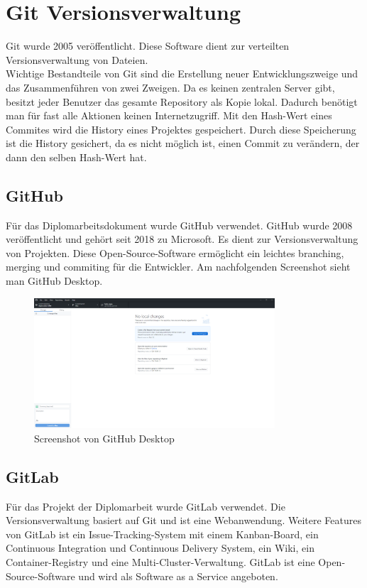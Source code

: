 \section{Git Versionsverwaltung}
Git wurde 2005 veröffentlicht. Diese Software dient zur verteilten Versionsverwaltung von Dateien.\\
Wichtige Bestandteile von Git sind die Erstellung neuer Entwicklungszweige und das Zusammenführen von zwei Zweigen. Da es keinen zentralen Server gibt, besitzt jeder Benutzer das gesamte Repository als Kopie lokal. Dadurch benötigt man für fast alle Aktionen keinen Internetzugriff. Mit den Hash-Wert eines Commites wird die History eines Projektes gespeichert. Durch diese Speicherung ist die History gesichert, da es nicht möglich ist, einen Commit zu verändern, der dann den selben Hash-Wert hat. \autocite{wikiGit}
\subsection{GitHub}
Für das Diplomarbeitsdokument wurde GitHub verwendet. GitHub wurde 2008 veröffentlicht und gehört seit 2018 zu Microsoft. Es dient zur Versionsverwaltung von Projekten. Diese Open-Source-Software ermöglicht ein leichtes branching, merging und commiting für die Entwickler. \autocite{wikiGitHub}
Am nachfolgenden Screenshot sieht man GitHub Desktop.
\begin{figure}[h]
	\centerline{
		\includegraphics[width=0.8\textwidth]{./grafiken/github_screen.png}
	}
	\vskip0pt
	\caption{Screenshot von GitHub Desktop} \label{fig:postman}
\end{figure}
\subsection{GitLab}
Für das Projekt der Diplomarbeit wurde GitLab verwendet. Die Versionsverwaltung basiert auf Git und ist eine Webanwendung. Weitere Features von GitLab ist ein Issue-Tracking-System mit einem Kanban-Board, ein Continuous Integration und Continuous Delivery System, ein Wiki, ein Container-Registry und eine Multi-Cluster-Verwaltung. GitLab ist eine Open-Source-Software und wird als Software as a Service angeboten. \autocite{wikiGitLab}